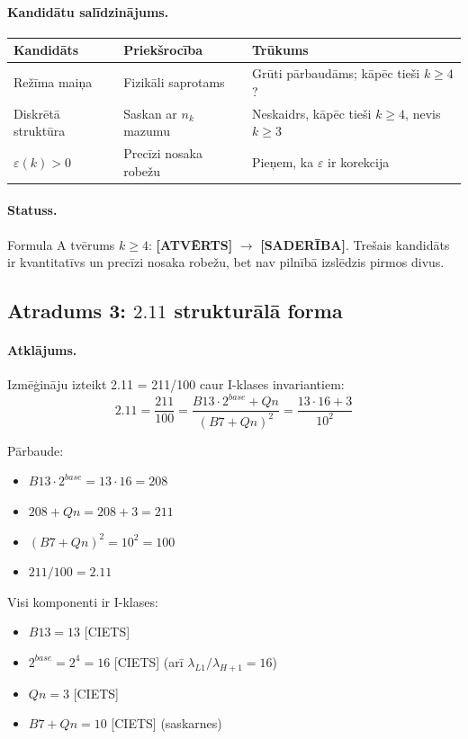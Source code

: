 \documentclass[12pt,a4paper]{article}
\begin{document}
\paragraph{Kandidātu salīdzinājums.}
\begin{table}[h]
\centering
\begin{tabular}{|l|l|l|}
\hline
\textbf{Kandidāts} & \textbf{Priekšrocība} & \textbf{Trūkums} \\
\hline
Režīma maiņa & Fizikāli saprotams & Grūti pārbaudāms; kāpēc tieši $k \geq 4$? \\
Diskrētā struktūra & Saskan ar $n_k$ mazumu & Neskaidrs, kāpēc tieši $k \geq 4$, nevis $k \geq 3$ \\
$\varepsilon(k) > 0$ & Precīzi nosaka robežu & Pieņem, ka $\varepsilon$ ir korekcija \\
\hline
\end{tabular}
\end{table}

\paragraph{Statuss.}
Formula A tvērums $k \geq 4$: \textbf{[ATVĒRTS]} $\to$ \textbf{[SADERĪBA]}. Trešais kandidāts ir kvantitatīvs un precīzi nosaka robežu, bet nav pilnībā izslēdzis pirmos divus.

\subsection*{Atradums 3: $2.11$ strukturālā forma}

\paragraph{Atklājums.}
Izmēģināju izteikt 2.11 = 211/100 caur I-klases invariantiem:
\[
\boxed{\; 2.11 = \frac{211}{100} = \frac{B13 \cdot 2^{base} + Qn}{(B7+Qn)^2} = \frac{13 \cdot 16 + 3}{10^2} \;}
\]

Pārbaude:
\begin{itemize}
    \item $B13 \cdot 2^{base} = 13 \cdot 16 = 208$
    \item $208 + Qn = 208 + 3 = 211$
    \item $(B7+Qn)^2 = 10^2 = 100$
    \item $211/100 = 2.11$ \checkmark
\end{itemize}

Visi komponenti ir I-klases:
\begin{itemize}
    \item $B13 = 13$ [CIETS]
    \item $2^{base} = 2^4 = 16$ [CIETS] (arī $\lambda_{L1}/\lambda_{H+1} = 16$)
    \item $Qn = 3$ [CIETS]
    \item $B7 + Qn = 10$ [CIETS] (saskarnes)
\end{itemize}
\end{document}
